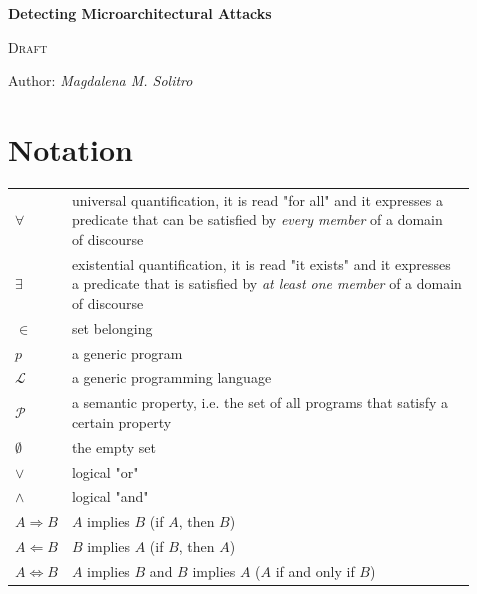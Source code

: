 \documentclass[12pt,a4paper]{book}
\theoremstyle{definition}
\begin{document}
	
	\begin{titlepage}
		\begin{center}
			\vspace*{1cm}
			
			\Huge
			\textbf{\Huge Detecting Microarchitectural Attacks}
			
			\vspace{0.3cm}
			\LARGE \textsc{Draft}
			
			\vspace{1.5cm}
			
			\large Author: \textit{Magdalena M. Solitro}
			
			\vfill
		\end{center}
	\end{titlepage}
	
	\tableofcontents
	
	\mainmatter
	
	\chapter*{Notation}\label{chapter:notation}
	
	\renewcommand{\arraystretch}{2.0}
	\setlength{\tabcolsep}{25pt}
	\begin{tabular}{l l}
		$\forall$ & \makecell[l]{universal quantification, it is read "for all" and it expresses a \\predicate that can be satisfied by \textit{every member} of a domain\\ of discourse} \\
		$\exists$ & \makecell[l]{existential quantification, it is read "it exists" and it expresses \\a predicate that is satisfied by \textit{at least one member} of a domain\\ of discourse} \\
		$\in$ & set belonging \\
		$p$ & a generic program \\
		$\mathcal{L}$ & a generic programming language \\
		$\mathcal{P}$ & \makecell[l]{a semantic property, i.e. the set of all programs that satisfy a\\certain property} \\
		$\emptyset$ & the empty set \\
		$\vee$ & logical "or"\\
		$\wedge$ & logical "and"\\
		$A \Longrightarrow B$ & $A$ implies $B$ (if $A$, then $B$)\\
		$A \Longleftarrow B$ & $B$ implies $A$ (if $B$, then $A$)\\
		$A \Longleftrightarrow B$& $A$ implies $B$ and $B$ implies $A$ ($A$ if and only if $B$)\\
	\end{tabular}\\
\end{document}
